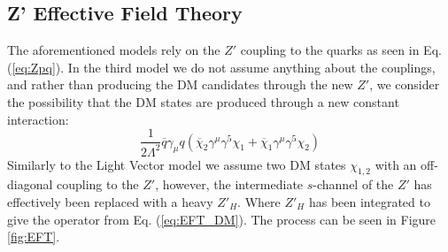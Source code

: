 \documentclass[12pt, a4paper]{book}
\begin{document}
\subsection{Z' Effective Field Theory}
The aforementioned models rely on the $Z'$ coupling to the quarks as seen in Eq. (\ref{eq:Zpq}). In the third model we do not assume anything about the couplings, and rather than producing the DM candidates through the new $Z'$, 
we consider the possibility that the DM states are produced through a new constant interaction: 
\begin{equation}\label{eq:EFT_DM}
    \frac{1}{2\Lambda^2}\overline{q}\gamma_\mu q(\overline{\chi}_2\gamma^\mu\gamma^5\chi_1 + \overline{\chi}_1\gamma^\mu\gamma^5\chi_2)
\end{equation}
Similarly to the Light Vector model we assume two DM states $\chi_{1,2}$ with an off-diagonal coupling to the $Z'$, however, the intermediate $s$-channel of the $Z'$ has effectively been replaced with a heavy $Z'_H$. Where $Z'_H$ 
has been integrated to give the operator from Eq. (\ref{eq:EFT_DM}). The process can be seen in Figure \ref{fig:EFT}.
\end{document}
